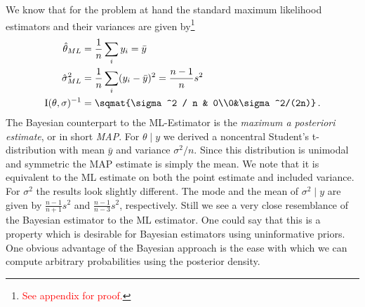 We know that for the problem at hand the standard maximum likelihood estimators
and their variances are given by\footnote{\textcolor{red}{See appendix for proof.}}
\begin{align}
  \hat{\theta}_{ML} &= \frac{1}{n} \sum_i y_i = \bar{y}\,\\
  \hat{\sigma}_{ML}^2 &= \frac{1}{n} \sum_i (y_i - \bar{y})^2 = \frac{n-1}{n} s^2\,\\
  \mathrm{I}(\theta, \sigma)^{-1} &= \sqmat{\sigma^2 / n & 0\\0&\sigma^2/(2n)} \,.
\end{align}
The Bayesian counterpart to the ML-Estimator is the \emph{maximum a posteriori estimate},
or in short \emph{MAP}. For $\theta \mid y$ we derived a noncentral Student's t-distribution
with mean $\bar{y}$ and variance $\sigma^2/n$. Since this distribution is unimodal and
symmetric the MAP estimate is simply the mean. We note that it is equivalent to
the ML estimate on both the point estimate and included variance. For $\sigma^2$
the results look slightly different. The mode and the mean of $\sigma^2 \mid y$
are given by $\frac{n-1}{n+1} s^2$ and $\frac{n-1}{n-3} s^2$, respectively.
Still we see a very close resemblance of the Bayesian estimator to the ML estimator.
One could say that this is a property which is desirable for Bayesian estimators
using uninformative priors. One obvious advantage of the Bayesian approach is the
ease with which we can compute arbitrary probabilities using the posterior density.

